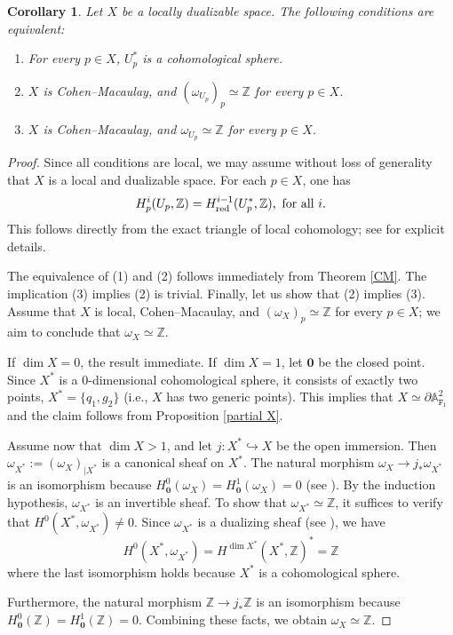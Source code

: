 \documentclass[amssymb,amscd,11pt,20pt]{amsart}
\newcommand{\FF}{{\mathtt F}}
\newcommand{\ZZ}{{\mathbb Z}}
\newcommand{\0}{\mathbf 0}
\newcommand{\A}{{\mathbb A}}
\theoremstyle{plain}
\newtheorem{cor}[thm]{Corollary}
\numberwithin{equation}{thm}
\begin{document}
\begin{cor}\label{Gor} Let $X$ be a locally dualizable space. The following conditions are equivalent:
\begin{enumerate} 
\item For every $p\in X$, $U_p^*$ is a cohomological sphere.
\item $X$ is Cohen--Macaulay, and $(\omega_{U_p})_p\simeq \ZZ$ for every $p\in X$.
\item $X$ is Cohen--Macaulay, and $\omega_{U_p}\simeq \ZZ$ for every $p\in X$.
\end{enumerate}
\end{cor}
\begin{proof} Since all conditions are local, we may assume without loss of generality that $X$ is a local and dualizable space.  For each $p\in X$, one has
\[ H^i_p(U_p,\ZZ)=H^{i-1}_{\text{\rm red}}(U_p^*,\ZZ),\text{ for all }i.\]
This follows directly from the exact triangle of local cohomology; see \cite[Lemma 1.6]{ST2} for explicit  details. 

The equivalence of (1) and (2) follows immediately  from Theorem \ref{CM}. The implication (3) implies (2) is trivial. Finally, let us show that (2) implies (3). Assume that $X$ is local, Cohen--Macaulay, and $(\omega_X)_p\simeq \ZZ$ for every $p\in X$; we aim to conclude that $ \omega_X \simeq \ZZ$. 

If $\dim X=0$, the result immediate. If $\dim X=1$, let $\0$ be the closed point. Since $X^*$ is a $0$-dimensional cohomological sphere, it consists of exactly two points,  $X^*=\{ q_1,g_2\}$ (i.e., $X$ has two generic points). This implies that $X\simeq \partial\A^2_{\FF_1}$ and the claim follows from Proposition \ref{partial X}. 

Assume now that  $\dim X>1$,  and let $j\colon X^*\hookrightarrow X$ be the open immersion. Then $\omega_{X^*}:=(\omega_X)_{\vert X^*}$ is a canonical sheaf on $X^*$. The natural morphism $\omega_X\to j_*\omega_{X^*}$ is an isomorphism because $H^0_{\0}(\omega_X)=H^1_{\0}(\omega_X)=0$ (see \cite[Thm. 5.18]{ST2}). By the induction hypothesis, $\omega_{X^*}$ is an invertible sheaf. To show that  $\omega_{X^*}\simeq \ZZ$, it suffices to verify that $H^0(X^*,\omega_{X^*})\neq 0$. Since $\omega_{X^*}$ is a dualizing sheaf (see \cite[Thm. 5.24, (B)]{ST2}), we have
\[H^0(X^*,\omega_{X^*})=H^{\dim X^*}(X^*,\ZZ)^*=\ZZ\] where the last isomorphism holds because $X^*$ is a cohomological sphere. 

Furthermore, the natural morphism $\ZZ\to j_*\ZZ$ is an isomorphism because $H^0_{\0}(\ZZ)=H^1_{\0}(\ZZ)=0$. Combining these facts, we obtain  $\omega_X\simeq\ZZ$.

\end{proof}
\end{document}
